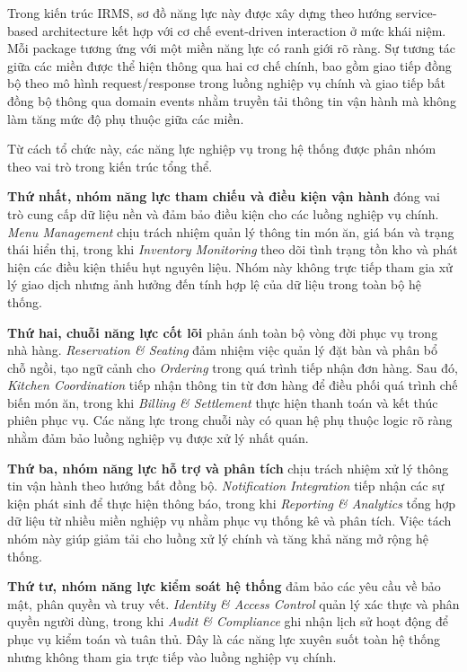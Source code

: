Trong kiến trúc IRMS, sơ đồ năng lực này được xây dựng theo hướng service-based architecture kết hợp với cơ chế event-driven interaction ở mức khái niệm. Mỗi package tương ứng với một miền năng lực có ranh giới rõ ràng. Sự tương tác giữa các miền được thể hiện thông qua hai cơ chế chính, bao gồm giao tiếp đồng bộ theo mô hình request/response trong luồng nghiệp vụ chính và giao tiếp bất đồng bộ thông qua domain events nhằm truyền tải thông tin vận hành mà không làm tăng mức độ phụ thuộc giữa các miền.

Từ cách tổ chức này, các năng lực nghiệp vụ trong hệ thống được phân nhóm theo vai trò trong kiến trúc tổng thể.

\textbf{Thứ nhất, nhóm năng lực tham chiếu và điều kiện vận hành} đóng vai trò cung cấp dữ liệu nền và đảm bảo điều kiện cho các luồng nghiệp vụ chính. \textit{Menu Management} chịu trách nhiệm quản lý thông tin món ăn, giá bán và trạng thái hiển thị, trong khi \textit{Inventory Monitoring} theo dõi tình trạng tồn kho và phát hiện các điều kiện thiếu hụt nguyên liệu. Nhóm này không trực tiếp tham gia xử lý giao dịch nhưng ảnh hưởng đến tính hợp lệ của dữ liệu trong toàn bộ hệ thống.

\textbf{Thứ hai, chuỗi năng lực cốt lõi} phản ánh toàn bộ vòng đời phục vụ trong nhà hàng. \textit{Reservation \& Seating} đảm nhiệm việc quản lý đặt bàn và phân bổ chỗ ngồi, tạo ngữ cảnh cho \textit{Ordering} trong quá trình tiếp nhận đơn hàng. Sau đó, \textit{Kitchen Coordination} tiếp nhận thông tin từ đơn hàng để điều phối quá trình chế biến món ăn, trong khi \textit{Billing \& Settlement} thực hiện thanh toán và kết thúc phiên phục vụ. Các năng lực trong chuỗi này có quan hệ phụ thuộc logic rõ ràng nhằm đảm bảo luồng nghiệp vụ được xử lý nhất quán.

\textbf{Thứ ba, nhóm năng lực hỗ trợ và phân tích} chịu trách nhiệm xử lý thông tin vận hành theo hướng bất đồng bộ. \textit{Notification Integration} tiếp nhận các sự kiện phát sinh để thực hiện thông báo, trong khi \textit{Reporting \& Analytics} tổng hợp dữ liệu từ nhiều miền nghiệp vụ nhằm phục vụ thống kê và phân tích. Việc tách nhóm này giúp giảm tải cho luồng xử lý chính và tăng khả năng mở rộng hệ thống.

\textbf{Thứ tư, nhóm năng lực kiểm soát hệ thống} đảm bảo các yêu cầu về bảo mật, phân quyền và truy vết. \textit{Identity \& Access Control} quản lý xác thực và phân quyền người dùng, trong khi \textit{Audit \& Compliance} ghi nhận lịch sử hoạt động để phục vụ kiểm toán và tuân thủ. Đây là các năng lực xuyên suốt toàn hệ thống nhưng không tham gia trực tiếp vào luồng nghiệp vụ chính.

